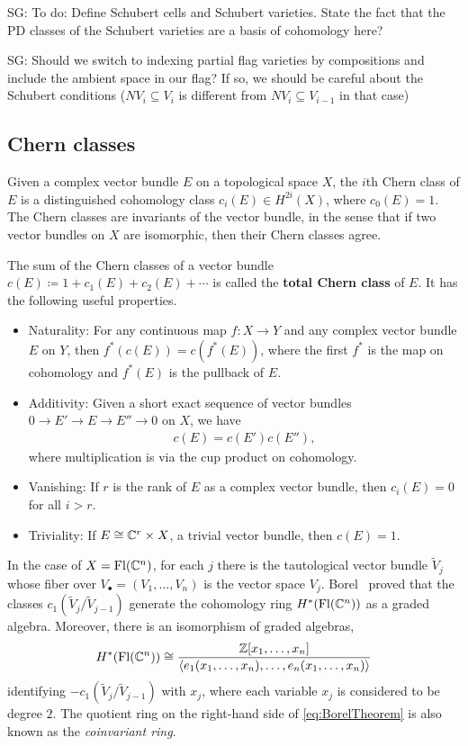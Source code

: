 \documentclass[12pt]{amsart}
\newcommand{\Fl}{\mathrm{Fl}}
\newcommand{\SG}[1]{{\color{red} SG: #1}}
\begin{document}
\SG{To do: Define Schubert cells and Schubert varieties. State the fact that the PD classes of the Schubert varieties are a basis of cohomology here?}

\SG{Should we switch to indexing partial flag varieties by compositions and include the ambient space in our flag? If so, we should be careful about the Schubert conditions ($NV_i\subseteq V_i$ is different from $NV_i\subseteq V_{i-1}$ in that case)}

\subsection{Chern classes} 

Given a complex vector bundle $E$ on a topological space $X$, the $i$th Chern class of $E$ is a distinguished cohomology class $c_i(E)\in H^{2i}(X)$, where $c_0(E) = 1$. The Chern classes are invariants of the vector bundle, in the sense that if two vector bundles on $X$ are isomorphic, then their Chern classes agree.  

The sum of the Chern classes of a vector bundle $c(E) \coloneqq 1+c_1(E) + c_2(E) +\cdots$ is called the {\bf total Chern class} of $E$. It has the following useful properties.
\begin{itemize}
    \item Naturality: For any continuous map $f : X \to Y$ and any complex vector bundle $E$ on $Y$, then $f^*(c(E)) = c(f^*(E))$, where the first $f^*$ is the map on cohomology and $f^*(E)$ is the pullback of $E$.
    \item Additivity: Given a short exact sequence of vector bundles $0\to E'\to E\to E''\to 0$ on $X$, we have
    \begin{align}
        c(E) = c(E')c(E''),
    \end{align}
    where multiplication is via the cup product on cohomology.
    \item Vanishing: If $r$ is the rank of $E$ as a complex vector bundle, then $c_i(E) = 0$ for all $i>r$.
    \item Triviality: If $E \cong \mathbb{C}^r \times X$, a trivial vector bundle, then $c(E) = 1$.
\end{itemize}

In the case of $X = \Fl(\bC^n)$, for each $j$ there is the tautological vector bundle $\widetilde V_j$ whose fiber over $V_\bullet = (V_1,\dots, V_n)$ is the vector space $V_{j}$. Borel~\cite{Borel} proved that the classes $c_1(\widetilde V_j/\widetilde V_{j-1})$ generate the cohomology ring $H^*(\Fl(\bC^n))$ as a graded algebra. Moreover, there is an isomorphism of graded algebras,
\begin{align}\label{eq:BorelTheorem}
    H^*(\Fl(\bC^n)) \cong \frac{\bZ[x_1,\dots, x_n]}{\langle e_1(x_1,\dots, x_n),\dots, e_n(x_1,\dots, x_n)\rangle}
\end{align}
identifying $-c_1(\widetilde V_j/\widetilde V_{j-1})$ with $x_j$, where each variable $x_j$ is considered to be degree $2$.
The quotient ring on the right-hand side of \eqref{eq:BorelTheorem} is also known as the \emph{coinvariant ring}.
\end{document}
